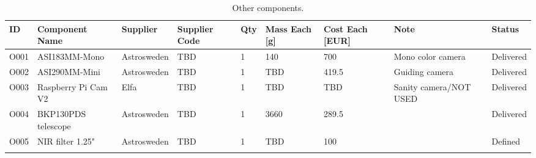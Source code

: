 

\begin{longtable}{|m{}|m{}|m{}|m{}|m{}|m{}|m{}|m{}|m{}|}

\hline
\textbf{ID} & \textbf{Component Name} & \textbf{Supplier} & \textbf{Supplier Code} & \textbf{Qty} & \textbf{Mass Each [g]} & \textbf{Cost Each [EUR]} & \textbf{Note} & \textbf{Status} \\ \hline

O001 & ASI183MM-Mono			& Astrosweden 	& TBD 	& 1 & 140 	& 700 & Mono color camera & Delivered \\\hline
O002 & ASI290MM-Mini			& Astrosweden 	& TBD 	& 1 & TBD 	& 419.5 & Guiding camera & Delivered \\\hline
O003 & Raspberry Pi Cam V2 		& Elfa 			& TBD 	& 1 & TBD 	& TBD & Sanity camera/NOT USED & Delivered \\\hline
O004 & BKP130PDS telescope 		& Astrosweden 	& TBD 	& 1 & 3660 	& 289.5 & & Delivered \\\hline
O005 & NIR filter 1.25" 		& Astrosweden 	& TBD 	& 1 & TBD 	& 100 & & Defined \\\hline



\caption{Other components.}
\label{tab:component-other}
\end{longtable}
\raggedbottom